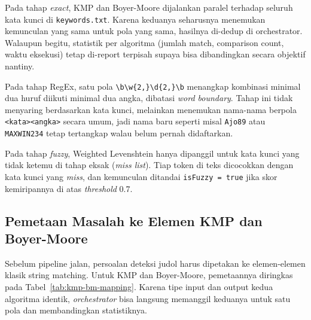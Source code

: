 \documentclass[11pt,a4paper]{article}
\begin{document}
Pada tahap \textit{exact}, KMP dan Boyer-Moore dijalankan paralel terhadap seluruh kata kunci di \texttt{keywords.txt}. Karena
keduanya seharusnya menemukan kemunculan yang sama untuk pola yang sama, hasilnya di-dedup di orchestrator. Walaupun begitu,
statistik per algoritma (jumlah match, comparison count, waktu eksekusi) tetap di-report terpisah supaya bisa dibandingkan secara
objektif nantiny.

Pada tahap RegEx, satu pola \verb|\b\w{2,}\d{2,}\b| menangkap kombinasi minimal dua huruf diikuti minimal dua angka, dibatasi
\textit{word boundary}. Tahap ini tidak menyaring berdasarkan kata kunci, melainkan menemukan nama-nama berpola \texttt{<kata><angka>}
secara umum, jadi nama baru seperti misal \texttt{Ajo89} atau \texttt{MAXWIN234} tetap tertangkap walau belum pernah didaftarkan.

Pada tahap \textit{fuzzy}, Weighted Levenshtein hanya dipanggil untuk kata kunci yang tidak ketemu di tahap eksak (\textit{miss
list}). Tiap token di teks dicocokkan dengan kata kunci yang \textit{miss}, dan kemunculan ditandai \texttt{isFuzzy = true} jika
skor kemiripannya di atas \textit{threshold} 0.7.

\subsection{Pemetaan Masalah ke Elemen KMP dan Boyer-Moore}

Sebelum pipeline jalan, persoalan deteksi judol harus dipetakan ke elemen-elemen klasik string matching. Untuk KMP dan
Boyer-Moore, pemetaannya diringkas pada Tabel~\ref{tab:kmp-bm-mapping}. Karena tipe input dan output kedua algoritma identik,
\textit{orchestrator} bisa langsung memanggil keduanya untuk satu pola dan membandingkan statistiknya.
\end{document}
